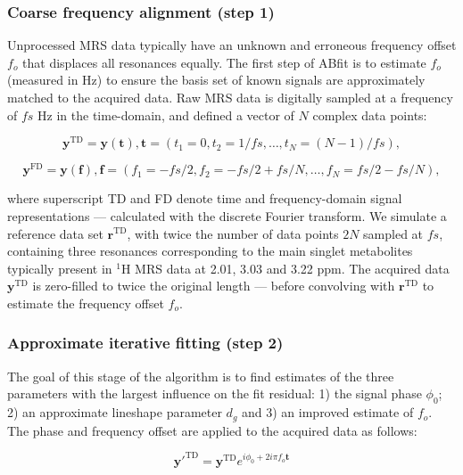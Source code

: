 \documentclass[num-refs]{wiley-article}
\begin{document}
\subsubsection{Coarse frequency alignment (step 1)}
Unprocessed MRS data typically have an unknown and erroneous frequency offset $f_{o}$ that displaces all resonances equally. The first step of ABfit is to estimate $f_{o}$ (measured in Hz) to ensure the basis set of known signals are approximately matched to the acquired data. Raw MRS data is digitally sampled at a frequency of $\mathit{fs}$ Hz in the time-domain, and defined a vector of $N$ complex data points:

\begin{equation}
  \mathbf{y}^{\mathrm{TD}} = \mathbf{y}(\mathbf{t}), \mathbf{t}=(t_{1}=0,t_{2} =1/\mathit{fs},\ldots,t_{N}=(N-1)/\mathit{fs}),
\end{equation}

\begin{equation}
  \mathbf{y}^{\mathrm{FD}} = \mathbf{y}(\mathbf{f}), \mathbf{f}=(f_{1}=-\mathit{fs}/2,f_{2} =-\mathit{fs}/2 + \mathit{fs}/N ,\ldots,f_{N}=\mathit{fs}/2 - \mathit{fs}/N),
\end{equation}

where superscript TD and FD denote time and frequency-domain signal representations --- calculated with the discrete Fourier transform. We simulate a reference data set $\mathbf{r}^{\mathrm{TD}}$, with twice the number of data points $2N$ sampled at $\mathit{fs}$, containing three resonances corresponding to the main singlet metabolites typically present in $^1\mathrm{H}$ MRS data at 2.01, 3.03 and 3.22 ppm. The acquired data $\mathbf{y}^{\mathrm{TD}}$ is zero-filled to twice the original length --- before convolving with  $\mathbf{r}^{\mathrm{TD}}$ to estimate the frequency offset $f_{o}$.

\subsubsection{Approximate iterative fitting (step 2)}
The goal of this stage of the algorithm is to find estimates of the three parameters with the largest influence on the fit residual: 1) the signal phase $\phi_{0}$; 2) an approximate lineshape parameter $d_{g}$ and 3) an improved estimate of $f_{o}$. The phase and frequency offset are applied to the acquired data as follows:

\begin{equation}
  \mathbf{y'}^{\mathrm{TD}} = \mathbf{y}^{\mathrm{TD}} e^{i \phi_{0} + 2 i \pi f_{o} \mathbf{t}}
\end{equation}
\end{document}
